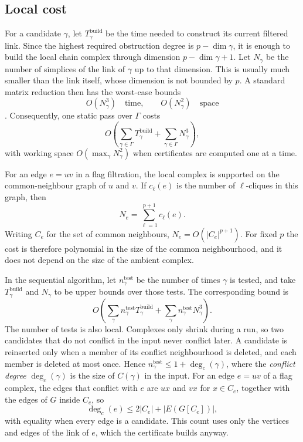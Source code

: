 \documentclass[11pt,letterpaper]{article}
\theoremstyle{definition}
\begin{document}
\subsection{Local cost}

For a candidate $\gamma$, let $T_\gamma^{\mathrm{build}}$ be the time needed
to construct its current filtered link. Since the highest required
obstruction degree is $p-\dim\gamma$, it is enough to build the local chain
complex through dimension $p-\dim\gamma+1$. Let $N_\gamma$ be the number of
simplices of the link of $\gamma$ up to that dimension. This is usually much
smaller than the link itself, whose dimension is not bounded by $p$. A
standard matrix reduction then has the worst-case bounds
$$
O(N_\gamma^3)\quad\text{time},
\qquad
O(N_\gamma^2)\quad\text{space}
$$
\cite{EdelsbrunnerLetscherZomorodian2002,ZomorodianCarlsson2005}.
Consequently, one static pass over $\Gamma$ costs
$$
O\left(
  \sum_{\gamma\in\Gamma}T_\gamma^{\mathrm{build}}
  +\sum_{\gamma\in\Gamma}N_\gamma^3
\right),
$$
with working space $O(\max_\gamma N_\gamma^2)$ when certificates are
computed one at a time.

For an edge $e=uv$ in a flag filtration, the local complex is supported on the
common-neighbour graph of $u$ and $v$. If $c_\ell(e)$ is the number of
$\ell$-cliques in this graph, then
$$
N_e=\sum_{\ell=1}^{p+1}c_\ell(e).
$$
Writing $C_e$ for the set of common neighbours, $N_e=O(|C_e|^{p+1})$. For
fixed $p$ the cost is therefore polynomial in the size of the common
neighbourhood, and it does not depend on the size of the ambient complex.

In the sequential algorithm, let $n_\gamma^{\mathrm{test}}$ be the number of
times $\gamma$ is tested, and take $T_\gamma^{\mathrm{build}}$ and
$N_\gamma$ to be upper bounds over those tests. The corresponding bound is
$$
O\left(
  \sum_\gamma n_\gamma^{\mathrm{test}}T_\gamma^{\mathrm{build}}
  +\sum_\gamma n_\gamma^{\mathrm{test}}N_\gamma^3
\right).
$$
The number of tests is also local. Complexes only shrink during a run, so two
candidates that do not conflict in the input never conflict later. A
candidate is reinserted only when a member of its conflict neighbourhood is
deleted, and each member is deleted at most once. Hence
$n_\gamma^{\mathrm{test}}\leq1+\deg_c(\gamma)$, where the \emph{conflict
degree} $\deg_c(\gamma)$ is the size of $C(\gamma)$ in the input. For an
edge $e=uv$ of a flag complex, the edges that conflict with $e$ are $ux$ and
$vx$ for $x\in C_e$, together with the edges of $G$ inside $C_e$, so
$$
\deg_c(e)\leq2|C_e|+|E(G[C_e])|,
$$
with equality when every edge is a candidate. This count uses only the
vertices and edges of the link of $e$, which the certificate builds anyway.
\end{document}
